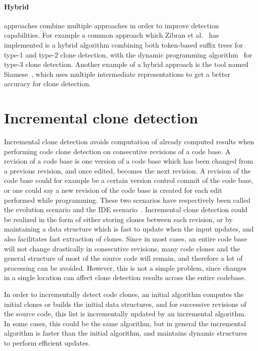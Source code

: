 \paragraph{Hybrid} approaches combine multiple approaches in order to improve detection
capabilities. For example a common approach which Zibran et
al.~\cite{Zibran_real_time_search} has implemented is a hybrid algorithm combining both
token-based suffix trees for type-1 and type-2 clone detection, with the dynamic
programming algorithm~\cite{BakerSparseDynamicProgramming} for type-3 clone detection.
Another example of a hybrid approach is the tool named
Siamese~\cite{SiameseScalableAndIncrementalClone}, which uses multiple intermediate
representations to get a better accuracy for clone detection.


\section{Incremental clone detection}

Incremental clone detection avoids computation of already computed results when performing
code clone detection on consecutive revisions of a code base.  A revision of a code base
is one version of a code base which has been changed from a previous revision, and once
edited, becomes the next revision.  A revision of the code base could for example be a
certain version control commit of the code base, or one could say a new revision of the
code base is created for each edit performed while programming. These two scenarios have
respectively been called the evolution scenario and the IDE
scenario~\cite{GodeIncrementalCloneDetection}. Incremental clone detection could be
realized in the form of either storing clones between each revision, or by maintaining a
data structure which is fast to update when the input updates, and also facilitates fast
extraction of clones. Since in most cases, an entire code base will not change drastically
in consecutive revisions, many code clones and the general structure of most of the source
code will remain, and therefore a lot of processing can be avoided. However, this is not a
simple problem, since changes in a single location can affect clone detection results
across the entire codebase.

In order to incrementally detect code clones, an initial algorithm computes the initial
clones or builds the initial data structures, and for successive revisions of the source
code, this list is incrementally updated by an incremental algorithm. In some cases, this
could be the same algorithm, but in general the incremental algorithm is faster than the
initial algorithm, and maintains dynamic structures to perform efficient updates. 

